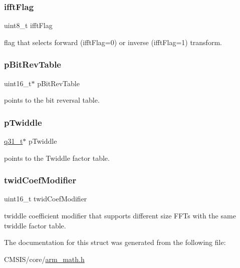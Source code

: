 \subsubsection{\texorpdfstring{ifftFlag}{ifftFlag}}
{\footnotesize\ttfamily uint8\+\_\+t ifft\+Flag}

flag that selects forward (ifft\+Flag=0) or inverse (ifft\+Flag=1) transform. \mbox{\label{structarm__cfft__radix2__instance__q31_a46a2fb328199897af100fea0bfdf59aa}} 
\subsubsection{\texorpdfstring{pBitRevTable}{pBitRevTable}}
{\footnotesize\ttfamily uint16\+\_\+t$\ast$ p\+Bit\+Rev\+Table}

points to the bit reversal table. \mbox{\label{structarm__cfft__radix2__instance__q31_a2505b7d5ec077b244c712797a5253b6d}} 
\subsubsection{\texorpdfstring{pTwiddle}{pTwiddle}}
{\footnotesize\ttfamily \mbox{\hyperlink{arm__math_8h_adc89a3547f5324b7b3b95adec3806bc0}{q31\+\_\+t}}$\ast$ p\+Twiddle}

points to the Twiddle factor table. \mbox{\label{structarm__cfft__radix2__instance__q31_afe772e5b5001c9d8e85032115a8df5bf}} 
\subsubsection{\texorpdfstring{twidCoefModifier}{twidCoefModifier}}
{\footnotesize\ttfamily uint16\+\_\+t twid\+Coef\+Modifier}

twiddle coefficient modifier that supports different size F\+F\+Ts with the same twiddle factor table. 

The documentation for this struct was generated from the following file\+:\begin{DoxyCompactItemize}
\item 
C\+M\+S\+I\+S/core/\mbox{\hyperlink{arm__math_8h}{arm\+\_\+math.\+h}}\end{DoxyCompactItemize}
